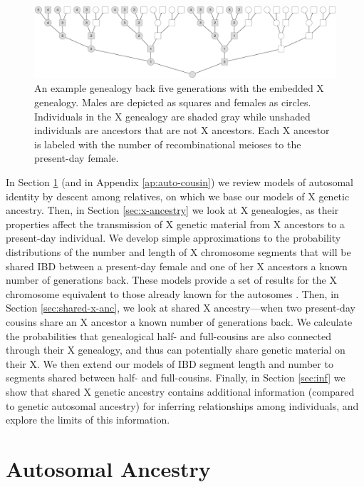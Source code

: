 \documentclass[11pt]{article}
\begin{document}
\begin{figure}[!ht]
  \centering
  \includegraphics[width=\textwidth]{images/x-rm-tree.eps}

  \caption{An example genealogy back five generations with the embedded X
    genealogy. Males are depicted as squares and females as circles.
    Individuals in the X genealogy are shaded gray while unshaded individuals
    are ancestors that are not X ancestors. Each X ancestor is labeled with the
  number of recombinational meioses to the present-day female.}
  \label{fig:x-rm-tree}
\end{figure}

In Section \ref{sec:auto-ancestry} (and in Appendix \ref{ap:auto-cousin}) we
review models of autosomal identity by descent among relatives, on which we
base our models of X genetic ancestry.  Then, in Section \ref{sec:x-ancestry}
we look at X genealogies, as their properties affect the transmission of X
genetic material from X ancestors to a present-day individual. We develop
simple approximations to the probability distributions of the number and length
of X chromosome segments that will be shared IBD between a present-day female
and one of her X ancestors a known number of generations back. These models
provide a set of results for the X chromosome equivalent to those already known
for the autosomes \citep{Donnelly:1983fi,thomas:1994hg}. Then, in Section
\ref{sec:shared-x-anc}, we look at shared X ancestry---when two present-day
cousins share an X ancestor a known number of generations back. We calculate
the probabilities that genealogical half- and full-cousins are also connected
through their X genealogy, and thus can potentially share genetic material on
their X. We then extend our models of IBD segment length and number to segments
shared between half- and full-cousins. Finally, in Section \ref{sec:inf} we
show that shared X genetic ancestry contains additional information (compared
to genetic autosomal ancestry) for inferring relationships among individuals,
and explore the limits of this information. 

\section{Autosomal Ancestry}
\label{sec:auto-ancestry}
\end{document}
